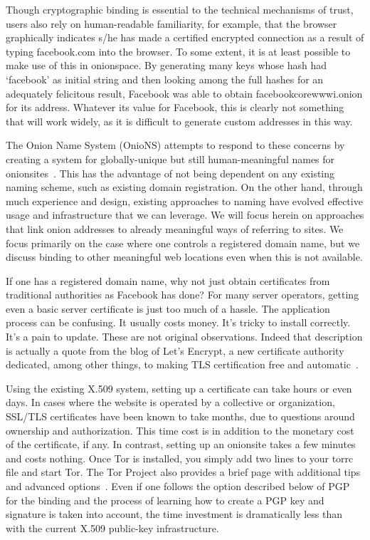 \documentclass[10pt, conference, compsocconf]{styles/IEEEtran}
\begin{document}
Though cryptographic binding is essential to the technical mechanisms
of trust, users also rely on human-readable familiarity, for example,
that the browser graphically indicates s/he has made a certified
encrypted connection as a result of typing facebook.com into the
browser.  To some extent, it is at least possible to make use of this
in onionspace. By generating many keys whose hash had `facebook' as
initial string and then looking among the full hashes for an
adequately felicitous result, Facebook was able to obtain
facebookcorewwwi.onion for its address. Whatever its value for
Facebook, this is clearly not something that will work widely, as it
is difficult to generate custom addresses in this way. 

The Onion Name System (OnioNS) attempts to respond to these concerns
by creating a system for globally-unique but still human-meaningful
names for onionsites~\cite{vickers-onions}.  This has the advantage of
not being dependent on any existing naming scheme, such as existing
domain registration. On the other hand, through much experience and
design, existing approaches to naming have evolved effective usage and
infrastructure that we can leverage. We will focus herein on
approaches that link onion addresses to already meaningful ways of
referring to sites. We focus primarily on the case where one controls
a registered domain name, but we discuss binding to other meaningful
web locations even when this is not available.

If one has a registered domain name,
why not just obtain certificates from traditional authorities as
Facebook has done? For many server operators, getting
even a basic server certificate is just too much of a hassle. The
application process can be confusing. It usually costs money. It's
tricky to install correctly. It's a pain to update. 
These are not original observations. Indeed that description is
actually a quote from the blog of Let's Encrypt, a new certificate
authority dedicated, among other things, to making TLS certification
free and automatic~\cite{lets-encrypt}.

Using the existing X.509 system, setting up a certificate can take
hours or even days. In cases where the website is operated by a
collective or organization, SSL/TLS certificates have been known to
take months, due to questions around ownership and authorization.
This time cost is in addition to the monetary cost of the certificate, if any.
In contrast, setting up an onionsite takes a few minutes and costs
nothing. Once Tor is installed, you simply add two lines to your torrc file 
and start Tor. The Tor Project also provides a brief page with
additional tips and advanced options~\cite{hs-config}.  Even if
one follows the option described below of PGP for the binding and the process
of learning how to create a PGP key and signature is taken into
account, the time investment is dramatically less than with the
current X.509 public-key infrastructure.
\end{document}

